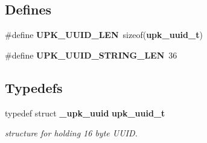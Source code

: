 \subsection*{Defines}
\begin{DoxyCompactItemize}
\item 
\#define {\bf UPK\_\-UUID\_\-LEN}~sizeof({\bf upk\_\-uuid\_\-t})
\item 
\#define {\bf UPK\_\-UUID\_\-STRING\_\-LEN}~36
\end{DoxyCompactItemize}
\subsection*{Typedefs}
\begin{DoxyCompactItemize}
\item 
typedef struct {\bf \_\-upk\_\-uuid} {\bf upk\_\-uuid\_\-t}
\begin{DoxyCompactList}\small\item\em structure for holding 16 byte UUID. \end{DoxyCompactList}\end{DoxyCompactItemize}
